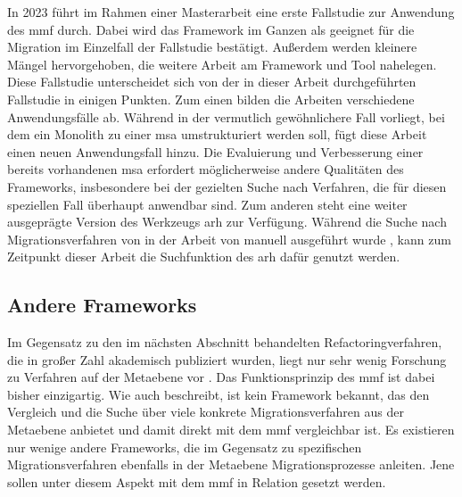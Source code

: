 In 2023 führt \citeauthor{master-marvin-knodel} im Rahmen einer Masterarbeit \cite{master-marvin-knodel} eine erste Fallstudie zur Anwendung des \gls{mmf} durch.
Dabei wird das Framework im Ganzen als geeignet für die Migration im Einzelfall der Fallstudie bestätigt.
Außerdem werden kleinere Mängel hervorgehoben, die weitere Arbeit am Framework und Tool nahelegen.
Diese Fallstudie unterscheidet sich von der in dieser Arbeit durchgeführten Fallstudie in einigen Punkten.
Zum einen bilden die Arbeiten verschiedene Anwendungsfälle ab.
Während in  der vermutlich gewöhnlichere Fall vorliegt, bei dem ein Monolith zu einer \gls{msa} umstrukturiert werden soll, fügt diese Arbeit einen neuen Anwendungsfall hinzu.
Die Evaluierung und Verbesserung einer bereits vorhandenen \gls{msa} erfordert möglicherweise andere Qualitäten des Frameworks, insbesondere bei der gezielten Suche nach Verfahren, die für diesen speziellen Fall überhaupt anwendbar sind.
Zum anderen steht eine weiter ausgeprägte Version des Werkzeugs \gls{arh} zur Verfügung.
Während die Suche nach Migrationsverfahren von in der Arbeit von \citeauthor{master-marvin-knodel} manuell ausgeführt wurde \cite{master-marvin-knodel}, kann zum Zeitpunkt dieser Arbeit die Suchfunktion des \gls{arh} dafür genutzt werden.

\subsection{Andere Frameworks}

Im Gegensatz zu den im nächsten Abschnitt behandelten Refactoringverfahren, die in großer Zahl akademisch publiziert wurden, liegt nur sehr wenig Forschung zu Verfahren auf der Metaebene vor \cite{on-a-metaprocess}.
Das Funktionsprinzip des \gls{mmf} ist dabei bisher einzigartig.
Wie auch  beschreibt, ist kein Framework bekannt, das den Vergleich und die Suche über viele konkrete Migrationsverfahren aus der Metaebene anbietet und damit direkt mit dem \gls{mmf} vergleichbar ist.
Es existieren nur wenige andere Frameworks, die im Gegensatz zu spezifischen Migrationsverfahren ebenfalls in der Metaebene Migrationsprozesse anleiten.
Jene sollen unter diesem Aspekt mit dem \gls{mmf} in Relation gesetzt werden.

